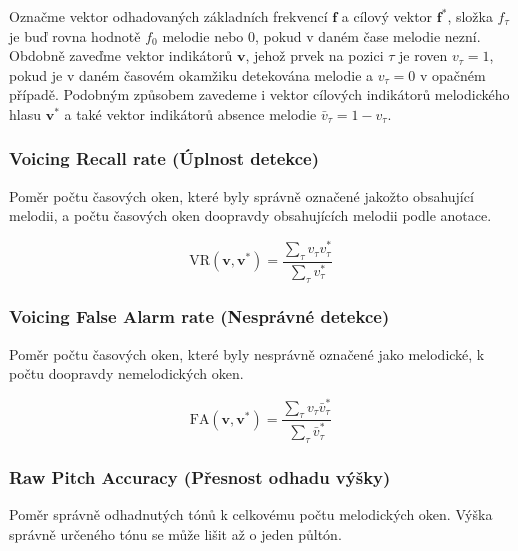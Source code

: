     Označme vektor odhadovaných základních frekvencí $\mathbf{f}$ a cílový vektor $\mathbf{f^*}$, složka $f_\tau$ je buď rovna hodnotě $f_0$ melodie nebo $0$, pokud v daném čase melodie nezní. Obdobně zaveďme vektor indikátorů $\mathbf{v}$, jehož prvek na pozici $\tau$ je roven $v_\tau=1$, pokud je v daném časovém okamžiku detekována melodie a $v_\tau = 0$ v opačném případě. Podobným způsobem zavedeme i vektor cílových indikátorů melodického hlasu $\mathbf{v^*}$ a také vektor indikátorů absence melodie $\bar{v}_\tau = 1 - v_\tau$. 

\subsubsection{Voicing Recall rate (Úplnost detekce)}

Poměr počtu časových oken, které byly správně označené jakožto obsahující melodii, a počtu časových oken doopravdy obsahujících melodii podle anotace.

    $$\mathrm{VR}(\mathbf{v}, \mathbf{v^*}) = \frac{\sum_\tau{v_\tau v^*_\tau}}{\sum_\tau{v^*_\tau}}$$



\subsubsection{Voicing False Alarm rate (Nesprávné detekce)}

Poměr počtu časových oken, které byly nesprávně označené jako melodické, k počtu doopravdy nemelodických oken.

    $$\mathrm{FA}(\mathbf{v}, \mathbf{v^*}) = \frac{\sum_\tau{v_\tau \bar{v}^*_\tau}}{\sum_\tau{\bar{v}^*_\tau}}$$



\subsubsection{Raw Pitch Accuracy (Přesnost odhadu výšky)}

Poměr správně odhadnutých tónů k celkovému počtu melodických oken. Výška správně určeného tónu se může lišit až o jeden půltón.


